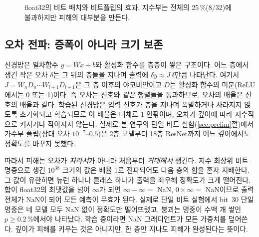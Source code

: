 \documentclass[11pt,a4paper]{article}
\begin{document}
\begin{figure}[H]
  \centering
  \caption{float32의 비트 배치와 비트플립의 효과. 지수부는 전체의 25\,\%(8/32)에 불과하지만 피해의 대부분을 만든다.}
  \label{fig:float32}
\end{figure}

\subsection{오차 전파: 증폭이 아니라 크기 보존}
신경망은 일차함수 $y = Wx + b$와 활성화 함수를 층층이 쌓은 구조이다. 어느 층에서 생긴 작은 오차 $\delta$는 그 뒤의 층들을 지나며 출력에 $\delta y \approx J\,\delta$만큼 나타난다. 여기서 $J = W_n D_n \cdots W_{l+1} D_{l+1}$은 그 층 이후의 야코비안이고 $D$는 활성화 함수의 미분(ReLU에서는 0 또는 1)이다. 즉 오차는 신호와 \emph{같은} 행렬들을 통과하므로, 오차의 배율은 신호의 배율과 같다. 학습된 신경망은 입력 신호가 층을 지나며 폭발하거나 사라지지 않도록 초기화되고 학습되므로 이 배율은 대체로 1 안팎이며, 오차가 깊이에 따라 지수적으로 커지거나 작아지지 않는다. 실제로 본 연구의 단일 비트 실험(\ref{sec:prelim}절)에서 가수부 플립(상대 오차 $10^{-7}$--$0.5$)은 2층 모델부터 18층 ResNet까지 어느 깊이에서도 정확도를 바꾸지 못했다.

따라서 피해는 오차가 \emph{자라서}가 아니라 처음부터 \emph{거대해서} 생긴다. 지수 최상위 비트 명중으로 생긴 $10^{38}$ 크기의 값은 배율 1로 전파되어도 다음 층의 합을 혼자 지배한다. 그 값이 유한하면 뉴런 하나나 클래스 하나가 출력을 좌우해 정확도가 크게 떨어진다. 합이 float32의 최댓값을 넘어 $\infty$가 되면 $\infty-\infty=$ NaN, $0\times\infty=$ NaN이므로 출력 전체가 NaN이 되어 모든 예측이 무효가 된다. 실제로 단일 비트 실험에서 bit~30 단일 명중은 네 모델 모두 NaN 없이 정확도만 떨어뜨렸고, 붕괴는 명중이 수백 개 쌓인 $p\ge0.2\,\%$에서야 나타났다. 학습 중이라면 NaN 그래디언트가 모든 가중치를 덮어쓴다. 깊이가 피해를 키우는 것은 아니지만, 한 층만 지나도 피해가 완성된다는 뜻이다.
\end{document}
